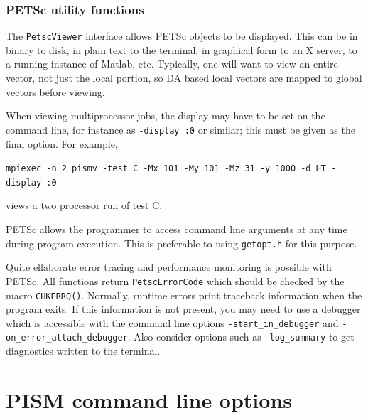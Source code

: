 \documentclass[11pt,final]{amsart}
\renewcommand{\t}[1]{\texttt{#1}}
\begin{document}
\subsubsection{PETSc utility functions}
The \t{PetscViewer} interface allows PETSc objects to be displayed. This can be in binary
to disk, in plain text to the terminal, in graphical form to an X server, to a running
instance of Matlab, etc. Typically, one will want to view an entire vector, not just the
local portion, so DA based local vectors are mapped to global vectors before viewing.

When viewing multiprocessor jobs, the display may have to be set on the command line, for instance as
\t{-display :0} or similar; this must be given as the final option.  For example,

\verb|mpiexec -n 2 pismv -test C -Mx 101 -My 101 -Mz 31 -y 1000 -d HT -display :0|

\noindent views a two processor run of test C.

PETSc allows the programmer to access command line arguments at any time during program
execution. This is preferable to using \t{getopt.h} for this purpose.

Quite ellaborate error tracing and performance monitoring is possible with PETSc.  All
functions return \t{PetscErrorCode} which should be checked by the macro \t{CHKERRQ()}.
Normally, runtime errors print traceback information when the program exits.  If this
information is not present, you may need to use a debugger which is accessible with the
command line options \verb|-start_in_debugger| and \verb|-on_error_attach_debugger|.  Also
consider options such as \verb|-log_summary| to get diagnostics written to the terminal.


\clearpage\newpage



\appendix

\newcommand{\rawopt}[1]{\vspace{1mm}\noindent \Large\texttt{-#1}\normalsize}
\newcommand{\opt}[1]{\rawopt{#1}\,:\quad}
\newcommand{\optdef}[2]{\rawopt{#1}\,[\textsl{#2}]:\quad}
\newcommand{\optrestrict}[2]{\rawopt{#1}\,[\texttt{#2} \textsl{only}]:\quad}
\newcommand{\optdefrestrict}[3]{\rawopt{#1}\,[\textsl{#2}]\,[\texttt{#3} \textsl{only}]:\quad}
\newcommand{\und}{$\underline{\,\,\,}$}

\clearpage\newpage
\section{PISM command line options}\label{sect:options}
\end{document}
